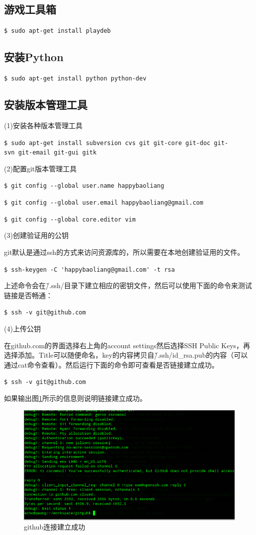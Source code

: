 \subsection{游戏工具箱}
\verb"$ sudo apt-get install playdeb"

\subsection{安装Python}
\verb"$ sudo apt-get install python python-dev"

\subsection{安装版本管理工具}
(1)安装各种版本管理工具 
		
\verb"$ sudo apt-get install subversion cvs git git-core git-doc git-svn git-email git-gui gitk"

(2)配置git版本管理工具

\verb"$ git config --global user.name happybaoliang"

\verb"$ git config --global user.email happybaoliang@gmail.com"

\verb"$ git config --global core.editor vim"

(3)创建验证用的公钥

git默认是通过ssh的方式来访问资源库的，所以需要在本地创建验证用的文件。

\verb"$ ssh-keygen -C 'happybaoliang@gmail.com' -t rsa"

上述命令会在\~/.ssh/目录下建立相应的密钥文件，然后可以使用下面的命令来测试链接是否畅通：

\verb"$ ssh -v git@github.com"

(4)上传公钥

在github.com的界面选择右上角的account settings然后选择SSH Public Keys，再选择添加。Title可以随便命名，key的内容拷贝自\~/.ssh/id\_rsa.pub的内容（可以通过cat命令查看）。然后运行下面的命令即可查看是否链接建立成功。

\verb"$ ssh -v git@github.com"

如果输出图\ref{github}所示的信息则说明链接建立成功。
\begin{figure}
\centering\includegraphics[scale=0.5]{figures/github.png}
\caption{github连接建立成功}\label{github}
\end{figure}

